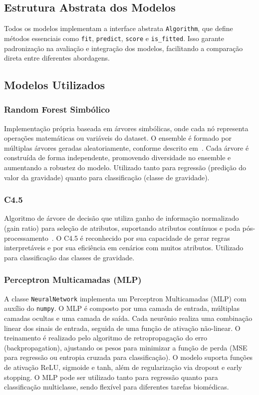 \documentclass[11pt]{article}
\begin{document}
\subsection{Estrutura Abstrata dos Modelos}
Todos os modelos implementam a interface abstrata \texttt{Algorithm}, que define métodos essenciais como \texttt{fit}, \texttt{predict}, \texttt{score} e \texttt{is\_fitted}. Isso garante padronização na avaliação e integração dos modelos, facilitando a comparação direta entre diferentes abordagens.

\subsection{Modelos Utilizados}
\subsubsection{Random Forest Simbólico}
Implementação própria baseada em árvores simbólicas, onde cada nó representa operações matemáticas ou variáveis do dataset. O ensemble é formado por múltiplas árvores geradas aleatoriamente, conforme descrito em~\cite{pedregosa2011scikit}. Cada árvore é construída de forma independente, promovendo diversidade no ensemble e aumentando a robustez do modelo. Utilizado tanto para regressão (predição do valor da gravidade) quanto para classificação (classe de gravidade).

\subsubsection{C4.5}
Algoritmo de árvore de decisão que utiliza ganho de informação normalizado (gain ratio) para seleção de atributos, suportando atributos contínuos e poda pós-processamento~\cite{quinlan1993c4.5}. O C4.5 é reconhecido por sua capacidade de gerar regras interpretáveis e por sua eficiência em cenários com muitos atributos. Utilizado para classificação das classes de gravidade.

\subsubsection{Perceptron Multicamadas (MLP)}
A classe \texttt{NeuralNetwork} implementa um Perceptron Multicamadas (MLP) com auxílio do \texttt{numpy}. O MLP é composto por uma camada de entrada, múltiplas camadas ocultas e uma camada de saída. Cada neurônio realiza uma combinação linear dos sinais de entrada, seguida de uma função de ativação não-linear. O treinamento é realizado pelo algoritmo de retropropagação do erro (backpropagation), ajustando os pesos para minimizar a função de perda (MSE para regressão ou entropia cruzada para classificação). O modelo suporta funções de ativação ReLU, sigmoide e tanh, além de regularização via dropout e early stopping. O MLP pode ser utilizado tanto para regressão quanto para classificação multiclasse, sendo flexível para diferentes tarefas biomédicas.
\end{document}
